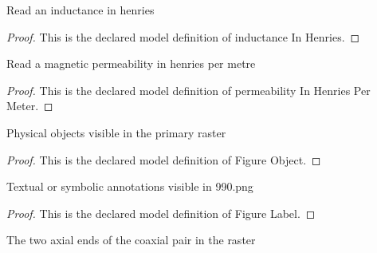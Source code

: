 \begin{definition}
  \label{def:physics:phyx-mini-0990:phyxminiproblems-problemphyxmini0990-inductanceinhenries}
  Read an inductance in henries
\end{definition}
\begin{proof}
  This is the declared model definition of inductance In Henries.
\end{proof}
\begin{definition}
  \label{def:physics:phyx-mini-0990:phyxminiproblems-problemphyxmini0990-permeabilityinhenriespermeter}
  Read a magnetic permeability in henries per metre
\end{definition}
\begin{proof}
  This is the declared model definition of permeability In Henries Per Meter.
\end{proof}
\begin{definition}
  \label{def:physics:phyx-mini-0990:phyxminiproblems-problemphyxmini0990-figureobject}
  Physical objects visible in the primary raster
\end{definition}
\begin{proof}
  This is the declared model definition of Figure Object.
\end{proof}
\begin{definition}
  \label{def:physics:phyx-mini-0990:phyxminiproblems-problemphyxmini0990-figurelabel}
  Textual or symbolic annotations visible in 990.png
\end{definition}
\begin{proof}
  This is the declared model definition of Figure Label.
\end{proof}
\begin{definition}
  \label{def:physics:phyx-mini-0990:phyxminiproblems-problemphyxmini0990-solenoidend}
  The two axial ends of the coaxial pair in the raster
\end{definition}
